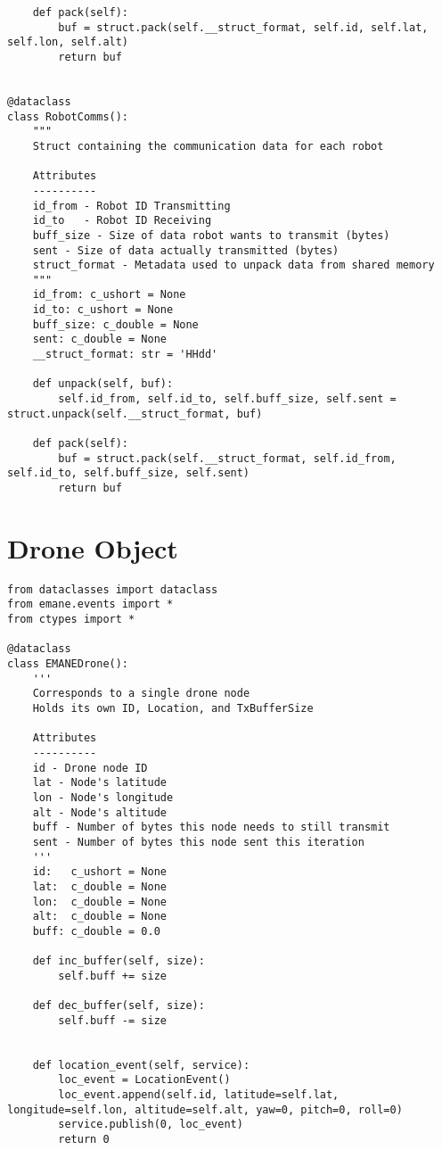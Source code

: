 \begin{verbatim}
    def pack(self):
        buf = struct.pack(self.__struct_format, self.id, self.lat, self.lon, self.alt)
        return buf


@dataclass
class RobotComms():
    """
    Struct containing the communication data for each robot

    Attributes
    ----------
    id_from - Robot ID Transmitting
    id_to   - Robot ID Receiving
    buff_size - Size of data robot wants to transmit (bytes)
    sent - Size of data actually transmitted (bytes)
    struct_format - Metadata used to unpack data from shared memory
    """
    id_from: c_ushort = None
    id_to: c_ushort = None
    buff_size: c_double = None
    sent: c_double = None
    __struct_format: str = 'HHdd'

    def unpack(self, buf):
        self.id_from, self.id_to, self.buff_size, self.sent = struct.unpack(self.__struct_format, buf)

    def pack(self):
        buf = struct.pack(self.__struct_format, self.id_from, self.id_to, self.buff_size, self.sent)
        return buf

\end{verbatim}

\section{Drone Object}
\begin{verbatim}
from dataclasses import dataclass
from emane.events import *
from ctypes import *

@dataclass
class EMANEDrone():
    '''
    Corresponds to a single drone node
    Holds its own ID, Location, and TxBufferSize
    
    Attributes
    ----------
    id - Drone node ID
    lat - Node's latitude
    lon - Node's longitude
    alt - Node's altitude
    buff - Number of bytes this node needs to still transmit
    sent - Number of bytes this node sent this iteration
    '''
    id:   c_ushort = None
    lat:  c_double = None
    lon:  c_double = None
    alt:  c_double = None
    buff: c_double = 0.0

    def inc_buffer(self, size):
        self.buff += size

    def dec_buffer(self, size):
        self.buff -= size


    def location_event(self, service):
        loc_event = LocationEvent()
        loc_event.append(self.id, latitude=self.lat, longitude=self.lon, altitude=self.alt, yaw=0, pitch=0, roll=0)
        service.publish(0, loc_event)
        return 0
\end{verbatim}
